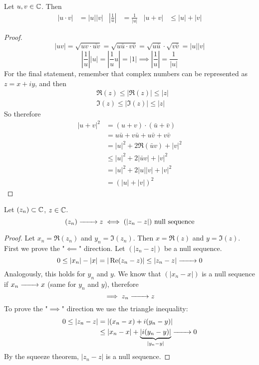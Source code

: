 \documentclass[../../script.tex]{subfiles}
\begin{document}
\begin{thm}
Let $u, v \in \mathbb{C}$. Then
\begin{align*}
	|u \cdot v| &= |u||v| & \left| \frac{1}{u} \right| &= \frac{1}{|u|} & |u + v| &\le |u| + |v|
\end{align*}
\end{thm}
\begin{proof}
\begin{equation}
	|uv| = \sqrt{uv \cdot \bar{uv}} = \sqrt{u\bar{u} \cdot v\bar{v}} = \sqrt{u\bar{u}} \cdot \sqrt{v\bar{v}} = |u||v|
\end{equation}
\begin{equation}
	\left| \frac{1}{u} \right| |u| = \left| \frac{1}{u} u \right| = |1| \implies \left| \frac{1}{u} \right| = \frac{1}{|u|}
\end{equation}
For the final statement, remember that complex numbers can be represented as $z = x + iy$, and then
\begin{align}
	&\Re(z) \le |\Re(z)| \le |z| \\
	&\Im(z) \le |\Im(z)| \le |z|
\end{align}
So therefore
\begin{equation}
\begin{split}
	|u + v|^2 &= (u + v) \cdot (\bar{u} + \bar{v}) \\
	&= u\bar{u} + v\bar{u} + u\bar{v} + v\bar{v} \\
	&= |u|^2 + 2\Re(\bar{u}v) + |v|^2 \\
	&\le |u|^2 + 2|\bar{u} v| + |v|^2 \\
	&= |u|^2 + 2|u||v| + |v|^2 \\
	&= (|u| + |v|)^2
\end{split}
\end{equation}
\end{proof}

\begin{lem}\label{lem:cmplxnull}
Let $(z_n) \subset \mathbb{C}$, $z \in \mathbb{C}$.
\[
	\seq{z} \conv{} z \iff (|z_n - z|) \text{ null sequence}
\]
\end{lem}
\begin{proof}
Let $x_n = \Re(z_n)$ and $y_n = \Im(z_n)$. Then $x = \Re(z)$ and $y = \Im(z)$. First we prove the "$\impliedby$" direction. Let $(|z_n - z|)$ be a null sequence.
\begin{equation}
	0 \le |x_n| - |x| = |\Re(z_n - z)| \le |z_n - z| \conv{} 0
\end{equation}
Analogously, this holds for $y_n$ and $y$. We know that $(|x_n - x|)$ is a null sequence if $x_n \conv{} x$ (same for $y_n$ and $y$), therefore
\begin{equation}
	\implies z_n \conv{} z
\end{equation}
To prove the "$\implies$" direction we use the triangle inequality:
\begin{equation}
\begin{split}
	0 \le |z_n - z| &= |(x_n - x) + i(y_n - y)| \\
	&\le |x_n - x| + \underbrace{|i(y_n - y)|}_{|y_n - y|} \conv{} 0
\end{split}
\end{equation}
By the squeeze theorem, $|z_n - z|$ is a null sequence.
\end{proof}
\end{document}
